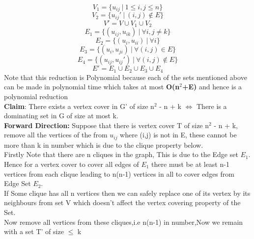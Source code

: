 \documentclass{report}
\begin{document}
 \begin{equation*}
     V_1 = \{u_{ij}\ |\ 1\leq i,j\leq n \} 
 \end{equation*}
 \begin{equation*}
     V_2 = \{u_{ij}' \ | \ (i,j) \not\in E \}
 \end{equation*}
 \begin{equation*}
     V' = V \cup V_1 \cup V_2
 \end{equation*}
 \begin{equation*}
     E_1 = \{(u_{ij},u_{ik}) \ | \ \forall i, j\neq k \}
 \end{equation*}
 \begin{equation*}
     E_2 = \{(u_i,u_{ii})\ | \ \forall i \}
 \end{equation*}
 \begin{equation*}
     E_3 = \{(u_i,u_{ji})\ | \ \forall (i,j) \in E \}
 \end{equation*}
 \begin{equation*}
     E_4 = \{(u_{ij},u_{ij}')\ | \ \forall (i,j) \not\in E \}
 \end{equation*}
 \begin{equation*}
     E' = E_1 \cup E_2 \cup E_3 \cup E_4
 \end{equation*}
 Note that this reduction is Polynomial because each of the sets mentioned above can be made in polynomial time which takes at most \textbf{O(n$^2$+E)} and hence is a polynomial reduction\\
 \textbf{Claim}: There exists a vertex cover in G' of size n$^2$ - n + k $\iff$ There is a dominating set in G of size at most k.\vspace*{0.5em}\\
 \textbf{Forward Direction:} Suppose that there is vertex cover T of size n$^2$ - n + k, remove all the vertices of the from $u_{ij}$ where (i,j) is not in E, these cannot be more than k in number which is due to the clique property below.\\
 Firstly Note that there are n cliques in the graph, This is due to the Edge set $E_1$. Hence for a vertex cover to cover all edges of $E_1$ there must be at least n-1 vertices from each clique leading to n(n-1) vertices in all to cover edges from Edge Set $E_2$.\\
 If Some clique has all n vertices then we can safely replace one of its vertex by its neighbours from set V which doesn't affect the vertex covering property of the Set.\\
 Now remove all vertices from these cliques,i.e n(n-1) in number,Now we remain with a set T' of size $\leq$ k\\
\end{document}
